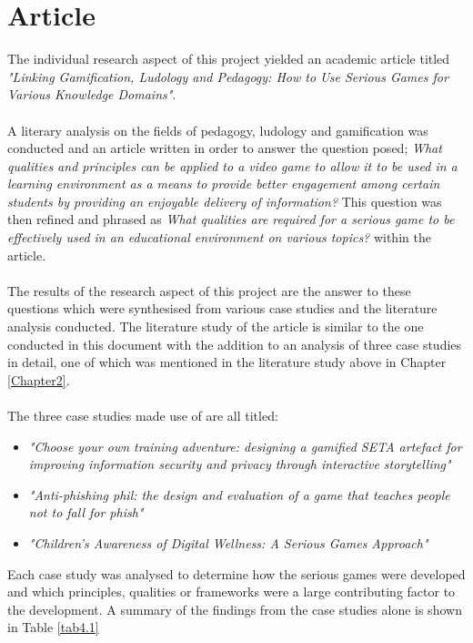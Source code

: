 \section{Article}
The individual research aspect of this project yielded an academic article titled \textit{"Linking Gamification, Ludology and Pedagogy: How to Use Serious Games for Various Knowledge Domains"}.
\\\\
A literary analysis on the fields of pedagogy, ludology and gamification was conducted and an article written in order to answer the question posed; \textit{What qualities and principles can be applied to a video game to allow it to be used in a learning environment as a means to provide better engagement among certain students by providing an enjoyable delivery of information?} This question was then refined and phrased as \textit{What qualities are required for a serious game to be effectively used in an educational environment on various topics?} within the article.
\\\\
The results of the research aspect of this project are the answer to these questions which were synthesised from various case studies and the literature analysis conducted. The literature study of the article is similar to the one conducted in this document with the addition to an analysis of three case studies in detail, one of which was mentioned in the literature study above in Chapter \ref{Chapter2}.
\\\\
The three case studies made use of are all titled:
\begin{itemize}
\item \textit{"Choose your own training adventure: designing a gamified SETA artefact for improving information security and privacy through interactive storytelling"}
\item \textit{"Anti-phishing phil: the design and evaluation of a game that teaches people not to fall for phish"}
\item \textit{"Children’s Awareness of Digital Wellness: A Serious Games Approach"}
\end{itemize}

\noindent Each case study was analysed to determine how the serious games were developed and which principles, qualities or frameworks were a large contributing factor to the development. A summary of the findings from the case studies alone is shown in Table \ref{tab4.1}


